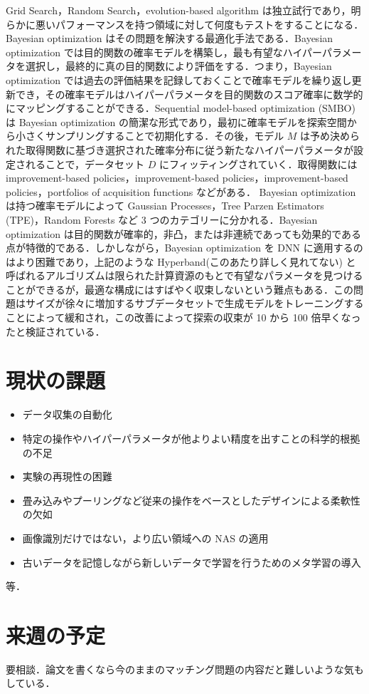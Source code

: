 \documentclass[twocolumn]{ujarticle}   %
\begin{document}
	Grid Search，Random Search，evolution-based algorithm は独立試行であり，明らかに悪いパフォーマンスを持つ領域に対して何度もテストをすることになる．Bayesian optimization はその問題を解決する最適化手法である．Bayesian optimization では目的関数の確率モデルを構築し，最も有望なハイパーパラメータを選択し，最終的に真の目的関数により評価をする．つまり，Bayesian optimization では過去の評価結果を記録しておくことで確率モデルを繰り返し更新でき，その確率モデルはハイパーパラメータを目的関数のスコア確率に数学的にマッピングすることができる．Sequential model-based optimization (SMBO) は Bayesian optimization の簡潔な形式であり，最初に確率モデルを探索空間から小さくサンプリングすることで初期化する．その後，モデル $M$ は予め決められた取得関数に基づき選択された確率分布に従う新たなハイパーパラメータが設定されることで，データセット $D$ にフィッティングされていく．取得関数には improvement-based policies，improvement-based policies，improvement-based policies，portfolios of acquisition functions などがある．
	Bayesian optimization は持つ確率モデルによって Gaussian Processes，Tree Parzen
  Estimators (TPE)，Random Forests など 3 つのカテゴリーに分かれる．Bayesian optimization は目的関数が確率的，非凸，または非連続であっても効果的である点が特徴的である．しかしながら，Bayesian optimization を DNN に適用するのはより困難であり，上記のような Hyperband(このあたり詳しく見れてない) と呼ばれるアルゴリズムは限られた計算資源のもとで有望なパラメータを見つけることができるが，最適な構成にはすばやく収束しないという難点もある．この問題はサイズが徐々に増加するサブデータセットで生成モデルをトレーニングすることによって緩和され，この改善によって探索の収束が 10 から 100 倍早くなったと検証されている．

	\section{現状の課題}
	\begin{itemize}
		\item{データ収集の自動化}
		\item{特定の操作やハイパーパラメータが他よりよい精度を出すことの科学的根拠の不足}
		\item{実験の再現性の困難}
		\item{畳み込みやプーリングなど従来の操作をベースとしたデザインによる柔軟性の欠如}
		\item{画像識別だけではない，より広い領域への NAS の適用}
		\item{古いデータを記憶しながら新しいデータで学習を行うためのメタ学習の導入}
	\end{itemize}

	等．

	\section{来週の予定}\noindent
	要相談．論文を書くなら今のままのマッチング問題の内容だと難しいような気もしている．

	
	
\end{document}
